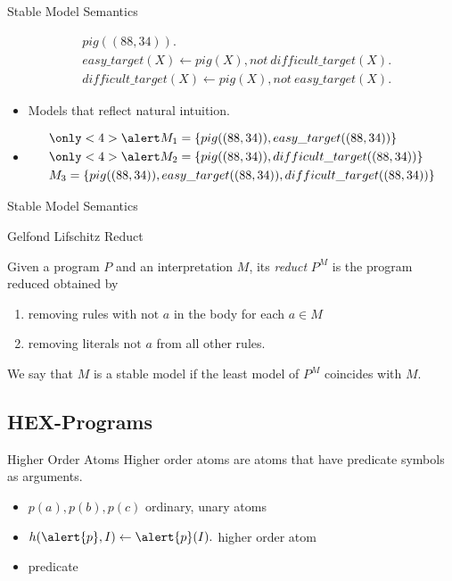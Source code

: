 \documentclass[smaller,dvipsnames]{beamer}
\begin{document}
\begin{frame}{Stable Model Semantics}
    \begin{center}
    	\begin{align*}
			&pig((88,34)). \\
			&easy\_target(X) \leftarrow pig(X), not\: difficult\_target(X). \\ 
			&difficult\_target(X) \leftarrow pig(X), not\: easy\_target(X). 
		\end{align*}
    \end{center}
    \begin{itemize}
    	\item<2->[] Models that reflect natural intuition.
    	\item<3->[]
    		\begin{align*}
				&\only<4>{\alert}{ M_1= \{pig((88,34)), easy\_target((88,34))\}  } \\
				&\only<4>{\alert}{ M_2= \{pig((88,34)), difficult\_target((88,34))\}  }\\
				&M_3= \{pig((88,34)), easy\_target((88,34)), difficult\_target((88,34))\}
    		\end{align*}
    \end{itemize}
\end{frame}

\begin{frame}{Stable Model Semantics}
	\begin{center} {\large{Gelfond Lifschitz Reduct}} \end{center}
	Given a program \(P\) and an interpretation \(M\), its \emph{reduct} \(P^M\) is the program reduced obtained by 
	\begin{enumerate}
		\item removing rules with \(\text{not } a\) in the body for each \(a \in M\)
		\item removing literals \(\text{not } a\) from all other rules.
	\end{enumerate}	  
	We say that \(M\) is a stable model if the least model of \(P^M\) coincides with \(M\).
\end{frame}

\subsection{HEX-Programs}

\begin{frame}{Higher Order Atoms}
	Higher order atoms are atoms that have predicate symbols as arguments.
	\begin{itemize}[<+->]
		\item[] \(p(a),p(b),p(c)\) \quad \quad \quad \quad \quad ordinary, unary atoms
		\item[] \(h(\alert{p},I) \leftarrow \alert{p}(I).\) \quad \quad \quad \quad \quad higher order atom
		\item[] \alert{predicate}
	\end{itemize}
\end{frame}
\end{document}
